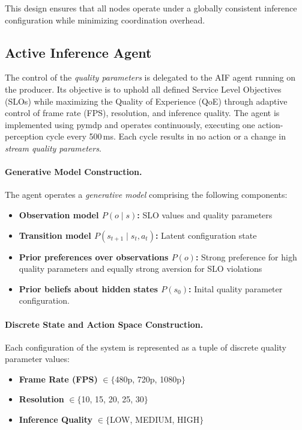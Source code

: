 This design ensures that all nodes operate under a globally consistent inference configuration while minimizing coordination overhead.

\subsection{Active Inference Agent}
\label{sec:evaluation-implementation-active-infernce-agemt}
The control of the \textit{quality parameters} is delegated to the AIF agent running on the producer. Its objective is to uphold all defined Service Level Objectives (SLOs) while maximizing the Quality of Experience (QoE) through adaptive control of frame rate (FPS), resolution, and inference quality. The agent is implemented using pymdp \cite{heins_pymdp_2022} and operates continuously, executing one action-perception cycle every 500\,ms. Each cycle results in no action or a change in \textit{stream quality parameters}. 

\paragraph{Generative Model Construction.}
The agent operates a \textit{generative model} comprising the following components:
\begin{itemize}
  \item \textbf{Observation model \(P(o \mid s)\):} SLO values and quality parameters
  \item \textbf{Transition model \(P(s_{t+1} \mid s_t,a_t)\):} Latent configuration state
  \item \textbf{Prior preferences over observations \(P(o)\):} Strong preference for high quality parameters and equally strong aversion for SLO violations
  \item \textbf{Prior beliefs about hidden states \(P(s_0)\):} Inital quality parameter configuration.
\end{itemize}

\paragraph{Discrete State and Action Space Construction.}
Each configuration of the system is represented as a tuple of discrete quality parameter values:
\begin{itemize}
  \item \textbf{Frame Rate (FPS)} $\in \{$480p, 720p, 1080p$\}$
  \item \textbf{Resolution} $\in \{$10, 15, 20, 25, 30$\}$
  \item \textbf{Inference Quality} $\in \{$LOW, MEDIUM, HIGH$\}$
\end{itemize}

